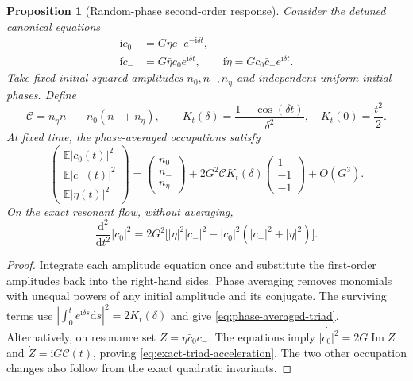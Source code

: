 \documentclass[11pt,a4paper,oneside]{book}
\theoremstyle{plain}
\newtheorem{proposition}[theorem]{Proposition}
\theoremstyle{definition}
\theoremstyle{remark}
\newcommand{\E}{\mathbb E}
\newcommand{\dd}{\mathrm d}
\newcommand{\ii}{\mathrm i}
\newcommand{\src}[2]{\cite{#1}}
\begin{document}
\begin{proposition}[Random-phase second-order response]
\label{prop:random-phase-triad}
Consider the detuned canonical equations
\begin{equation}
 \begin{aligned}
 \ii\dot c_0&=G\eta c_-e^{-\ii\delta t},\\
 \ii\dot c_-&=G\bar\eta c_0e^{\ii\delta t},\qquad
 \ii\dot\eta=Gc_0\bar c_-e^{\ii\delta t}.
 \end{aligned}
 \label{eq:detuned-phase-triad}
\end{equation}
Take fixed initial squared amplitudes $n_0,n_-,n_\eta$ and independent
uniform initial phases.  Define
\begin{equation}
 \mathcal C=n_\eta n_--n_0(n_-+n_\eta),\qquad
 K_t(\delta)=\frac{1-\cos(\delta t)}{\delta^2},\quad K_t(0)=\frac{t^2}{2}.
 \label{eq:triad-collision-coefficient}
\end{equation}
At fixed time, the phase-averaged occupations satisfy
\begin{equation}
 \begin{pmatrix}
 \E|c_0(t)|^2\\ \E|c_-(t)|^2\\ \E|\eta(t)|^2
 \end{pmatrix}
 =\begin{pmatrix}n_0\\n_-\\n_\eta\end{pmatrix}
 +2G^2\mathcal C K_t(\delta)
       \begin{pmatrix}1\\-1\\-1\end{pmatrix}+O(G^3).
 \label{eq:phase-averaged-triad}
\end{equation}
On the exact resonant flow, without averaging,
\begin{equation}
 \frac{\dd^2}{\dd t^2}|c_0|^2
 =2G^2\bigl[|\eta|^2|c_-|^2-|c_0|^2(|c_-|^2+|\eta|^2)\bigr].
 \label{eq:exact-triad-acceleration}
\end{equation}
\end{proposition}
\begin{proof}
Integrate each amplitude equation once and substitute the first-order
amplitudes back into the right-hand sides.  Phase averaging removes
monomials with unequal powers of any initial amplitude and its
conjugate.  The surviving terms use
$|\int_0^t e^{\ii\delta s}\dd s|^2=2K_t(\delta)$ and give
\eqref{eq:phase-averaged-triad}.  Alternatively, on resonance set
$Z=\eta\bar c_0c_-$.  The equations imply
$\dot{|c_0|^2}=2G\operatorname{Im}Z$ and
$\dot Z=\ii G\mathcal C(t)$, proving
\eqref{eq:exact-triad-acceleration}.  The two other occupation changes
also follow from the exact quadratic invariants.
\end{proof}
\src{R20}{thm:v20v34-second-order}
\end{document}
